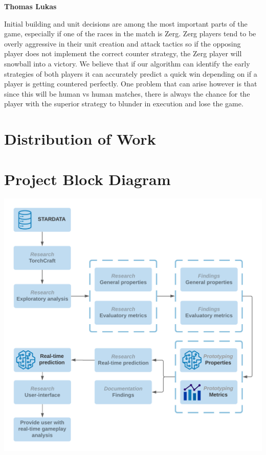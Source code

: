 \documentclass[a4paper,12pt]{report}
\newcommand{\msection}[1]{\noindent\textbf{#1}}
\begin{document}
\msection{Thomas Lukas}

Initial building and unit decisions are among the most important parts of the game, especially if one of the races in the match is Zerg. Zerg players tend to be overly aggressive in their unit creation and attack tactics so if the opposing player does not implement the correct counter strategy, the Zerg player will snowball into a victory. We believe that if our algorithm can identify the early strategies of both players it can accurately predict a quick win depending on if a player is getting countered perfectly. One problem that can arise however is that since this will be human vs human matches, there is always the chance for the player with the superior strategy to blunder in execution and lose the game.

\section{Distribution of Work}

\section{Project Block Diagram}
\begin{center}
    \captionsetup{type=figure}
    \includegraphics[width=.9\linewidth]{media/block_diagram.png}
\end{center}
\end{document}
